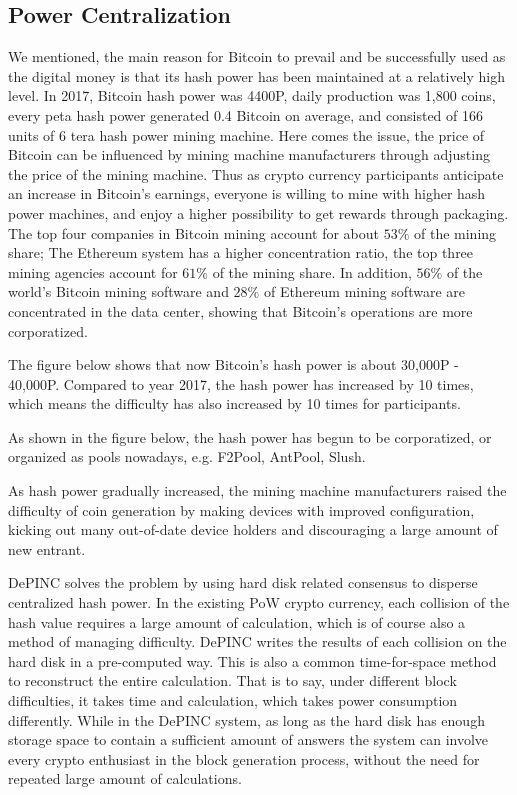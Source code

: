 \subsection{Power Centralization}
\begin{flushleft}
    We mentioned, the main reason for Bitcoin to prevail and be successfully used as the digital money is that its hash power has been maintained at a relatively high level. In 2017, Bitcoin hash power was 4400P, daily production was 1,800 coins, every peta hash power generated 0.4 Bitcoin on average, and consisted of 166 units of 6 tera hash power mining machine. Here comes the issue, the price of Bitcoin can be influenced by mining machine manufacturers through adjusting the price of the mining machine. Thus as crypto currency participants anticipate an increase in Bitcoin's earnings, everyone is willing to mine with higher hash power machines, and enjoy a higher possibility to get rewards through packaging. The top four companies in Bitcoin mining account for about $53\%$ of the mining share; The Ethereum system has a higher concentration ratio, the top three mining agencies account for $61\%$ of the mining share. In addition, $56\%$ of the world's Bitcoin mining software and $28\%$ of Ethereum mining software are concentrated in the data center, showing that Bitcoin's operations are more corporatized.
\end{flushleft}
\begin{flushleft}
    The figure below shows that now Bitcoin's hash power is about 30,000P - 40,000P. Compared to year 2017, the hash power has increased by 10 times, which means the difficulty has also increased by 10 times for participants.
\end{flushleft}
\begin{flushleft}
    As shown in the figure below, the hash power has begun to be corporatized, or organized as pools nowadays, e.g. F2Pool, AntPool, Slush.
\end{flushleft}

\begin{flushleft}
    As hash power gradually increased, the mining machine manufacturers raised the difficulty of coin generation by making devices with improved configuration, kicking out many out-of-date device holders and discouraging a large amount of new entrant.
\end{flushleft}
\begin{flushleft}
    DePINC solves the problem by using hard disk related consensus to disperse centralized hash power. In the existing PoW crypto currency, each collision of the hash value requires a large amount of calculation, which is of course also a method of managing difficulty. DePINC writes the results of each collision on the hard disk in a pre-computed way. This is also a common time-for-space method to reconstruct the entire calculation. That is to say, under different block difficulties, it takes time and calculation, which takes power consumption differently. While in the DePINC system, as long as the hard disk has enough storage space to contain a sufficient amount of answers the system can involve every crypto enthusiast in the block generation process, without the need for repeated large amount of calculations.
\end{flushleft}
